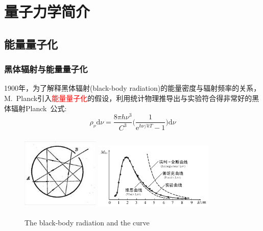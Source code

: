 \section{量子力学简介}
\subsection{能量量子化}

\frame
{
	\frametitle{黑体辐射与能量量子化}
	\textrm{1900}年，为了解释黑体辐射\textrm{(black-body radiation)}的能量密度与辐射频率的关系，\textrm{M.~Planck}引入\textcolor{red}{能量量子化}的假设，利用统计物理推导出与实验符合得非常好的黑体辐射\textrm{Planck~}公式:~
	\begin{displaymath}
		\rho_{\nu}\mathrm{d}{\nu}=\dfrac{8{\pi}h{\nu}^3}{C^3}\bigg(\dfrac1{\mathrm{e}^{h\nu/kT}-1}\bigg)\mathrm{d}\nu
	\end{displaymath}
\begin{figure}[h!]
\centering
\vspace{-10.5pt}
\includegraphics[height=1.45in,width=1.45in,viewport=0 0 136 136,clip]{Figures/Black_box.jpg}
\hskip 1pt
\includegraphics[height=1.32in,width=2.25in,viewport=0 0 390 215,clip]{Figures/Black_box_curve.png}
\caption{\textrm{The black-body radiation and the curve}}
\label{Black_box}
\end{figure}
}

